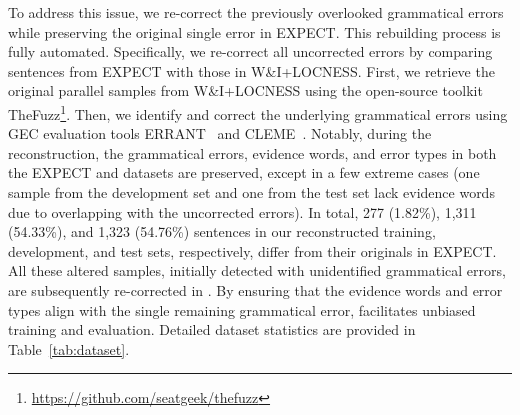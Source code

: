 To address this issue, we re-correct the previously overlooked grammatical errors while preserving the original single error in EXPECT. This rebuilding process is fully automated. Specifically, we re-correct all uncorrected errors by comparing sentences from EXPECT with those in W\&I+LOCNESS. First, we retrieve the original parallel samples from W\&I+LOCNESS using the open-source toolkit TheFuzz\footnote{\url{https://github.com/seatgeek/thefuzz}}. Then, we identify and correct the underlying grammatical errors using GEC evaluation tools ERRANT~\citep{bryant-etal-2017-automatic} and CLEME~\citep{ye2023cleme}. Notably, during the reconstruction, the grammatical errors, evidence words, and error types in both the EXPECT and \Dataset{} datasets are preserved, except in a few extreme cases (one sample from the development set and one from the test set lack evidence words due to overlapping with the uncorrected errors). In total, 277 (1.82\%), 1,311 (54.33\%), and 1,323 (54.76\%) sentences in our reconstructed training, development, and test sets, respectively, differ from their originals in EXPECT. All these altered samples, initially detected with unidentified grammatical errors, are subsequently re-corrected in \Dataset{}. By ensuring that the evidence words and error types align with the single remaining grammatical error, \Dataset{} facilitates unbiased training and evaluation. Detailed dataset statistics are provided in Table~\ref{tab:dataset}.
